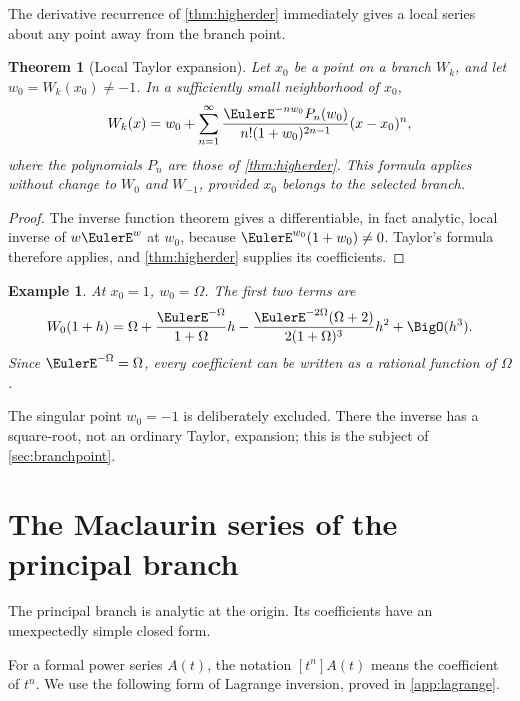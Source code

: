 \documentclass[11pt]{article}
\newtheorem{theorem}{Theorem}[section]
\newtheorem{example}[example]{Example}
\theoremstyle{remark}
\begin{document}
The derivative recurrence of \cref{thm:higherder} immediately gives a local
series about any point away from the branch point.

\begin{theorem}[Local Taylor expansion]\label{thm:generalTaylor}
Let \(x_0\) be a point on a branch \(W_k\), and let
\(w_0=W_k(x_0)\neq-1\).  In a sufficiently small neighborhood of \(x_0\),
\begin{equation}\label{eq:generalTaylor}
 W_k(x)=w_0+
 \sum_{n=1}^{\infty}
 \frac{\EulerE^{-nw_0}P_n(w_0)}
      {n!(1+w_0)^{2n-1}}(x-x_0)^n,
\end{equation}
where the polynomials \(P_n\) are those of
\cref{thm:higherder}.  This formula applies without change to \(W_0\) and
\(W_{-1}\), provided \(x_0\) belongs to the selected branch.
\end{theorem}

\begin{proof}
The inverse function theorem gives a differentiable, in fact analytic, local
inverse of \(w\EulerE^w\) at \(w_0\), because
\(\EulerE^{w_0}(1+w_0)\neq0\).  Taylor's formula therefore applies, and
\cref{thm:higherder} supplies its coefficients.
\end{proof}

\begin{example}
At \(x_0=1\), \(w_0=\Omega\).  The first two terms are
\[
 W_0(1+h)=\Omega+
 \frac{\EulerE^{-\Omega}}{1+\Omega}h
 -\frac{\EulerE^{-2\Omega}(\Omega+2)}
        {2(1+\Omega)^3}h^2+\BigO(h^3).
\]
Since \(\EulerE^{-\Omega}=\Omega\), every coefficient can be written as a
rational function of \(\Omega\).
\end{example}

The singular point \(w_0=-1\) is deliberately excluded.  There the inverse
has a square-root, not an ordinary Taylor, expansion; this is the subject of
\cref{sec:branchpoint}.

\section{The Maclaurin series of the principal branch}\label{sec:maclaurin}

The principal branch is analytic at the origin.  Its coefficients have an
unexpectedly simple closed form.

For a formal power series \(A(t)\), the notation \([t^n]A(t)\) means the
coefficient of \(t^n\).  We use the following form of Lagrange inversion,
proved in \cref{app:lagrange}.
\end{document}
